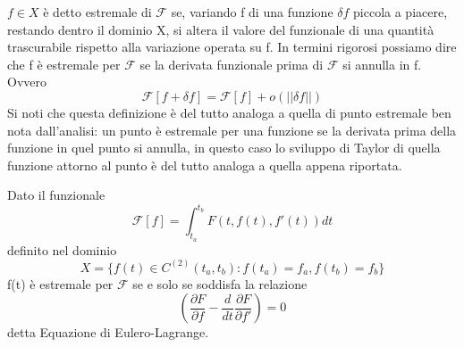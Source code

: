 \documentclass[
10pt, %
a4paper, %
oneside, %
headinclude,footinclude, %
BCOR5mm, %
]{scrartcl}
\begin{document}
\begin{definizione}
	\(f\in X\) è detto estremale di $\mathcal{F}$ se, variando f di una funzione \(\delta f\) piccola a piacere, restando dentro il dominio X, si altera il valore del funzionale di una quantità trascurabile rispetto alla variazione operata su f. In termini rigorosi possiamo dire che f è estremale per $\mathcal{F}$ se la derivata funzionale prima di $\mathcal{F}$ si annulla in f. Ovvero
	\[\mathcal{F}[f+\delta f] = \mathcal{F}[f]+o(||\delta f||)\] 
	Si noti che questa definizione è del tutto analoga a quella di punto estremale ben nota dall'analisi: un punto è estremale per una funzione se la derivata prima della funzione in quel punto si annulla, in questo caso lo sviluppo di Taylor di quella funzione attorno al punto è del tutto analoga a quella appena riportata.
\end{definizione}
\begin{teorema}
	Dato il funzionale
	\[\mathcal{F}[f] = \int_{t_a}^{t_b}F(t, f(t), f'(t))dt\]
	definito nel dominio
	\[X = \{f(t)\in C^{(2)}(t_a, t_b): f(t_a) = f_a, f(t_b) = f_b\}\]
	f(t) è estremale per $\mathcal{F}$ se e solo se soddisfa la relazione
	\[\left(\frac{\partial F}{\partial f}- \frac{d}{dt}\frac{\partial F}{\partial f'}\right) = 0\]
	detta Equazione di Eulero-Lagrange.
\end{teorema}
\end{document}
